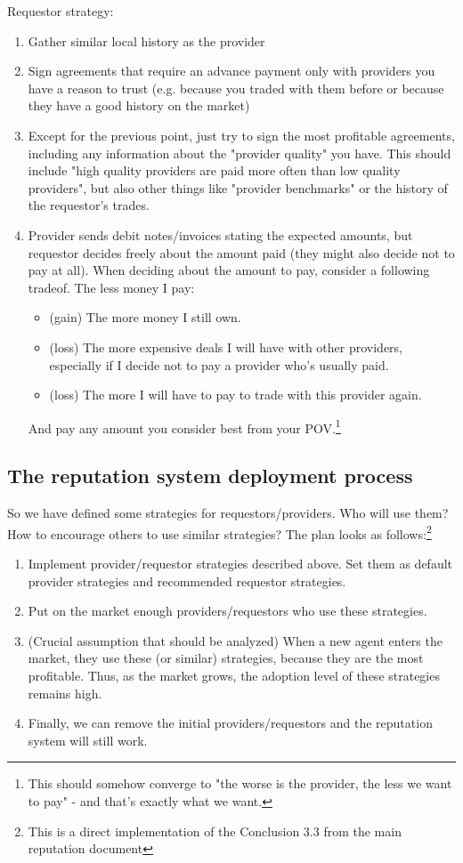\documentclass{article}
\begin{document}
Requestor strategy:
\begin{enumerate}
    \item Gather similar local history as the provider
    \item Sign agreements that require an advance payment only with providers you have a reason to trust 
        (e.g. because you traded with them before or because they have a good history on the market)
    \item Except for the previous point, just try to sign the most profitable agreements, including any information about the "provider quality" you have.
        This should include "high quality providers are paid more often than low quality providers", but also other things like "provider benchmarks" or
        the history of the requestor's trades.
    \item Provider sends debit notes/invoices stating the expected amounts, but requestor decides freely about the amount paid (they might also decide not to pay at all).
        When deciding about the amount to pay, consider a following tradeof. The less money I pay:
        \begin{itemize}
            \item (gain) The more money I still own.
            \item (loss) The more expensive deals I will have with other providers, especially if I decide not to pay a provider who's usually paid.
            \item (loss) The more I will have to pay to trade with this provider again.
        \end{itemize}
        And pay any amount you consider best from your POV.\footnote{
            This should somehow converge to "the worse is the provider, the less we want to pay" - and that's exactly what we want.
        }
\end{enumerate}

\subsection{The reputation system deployment process}

So we have defined some strategies for requestors/providers.
Who will use them? How to encourage others to use similar strategies?
The plan looks as follows:\footnote{This is a direct implementation of the Conclusion 3.3 from the main reputation document}
\begin{enumerate}
    \item Implement provider/requestor strategies described above. Set them as default provider strategies and recommended requestor strategies.
    \item Put on the market enough providers/requestors who use these strategies.
    \item (Crucial assumption that should be analyzed) When a new agent enters the market, they use these (or similar) strategies, because they
        are the most profitable. Thus, as the market grows, the adoption level of these strategies remains high.
    \item Finally, we can remove the initial providers/requestors and the reputation system will still work.
\end{enumerate}
\end{document}
